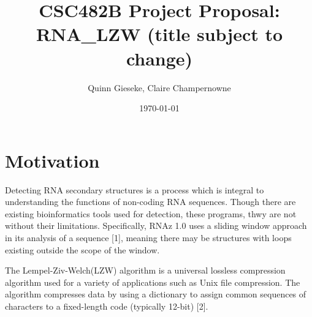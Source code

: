 \documentclass[letterpaper, 12pt]{artikel3}
\title{CSC482B Project Proposal: RNA\_LZW (title subject to change)}
\date{\today}
\author{Quinn Gieseke, Claire Champernowne}
\begin{document}
\maketitle










\section*{Motivation}
Detecting RNA secondary structures is a process which is integral to understanding the functions of non-coding RNA sequences. Though there are existing bioinformatics tools used for detection, these programs, thwy are not without their limitations.  Specifically,  RNAz 1.0 uses a sliding window approach in its analysis of a sequence [1], meaning there may be structures with loops existing outside the scope of the window. 

The Lempel-Ziv-Welch(LZW) algorithm is a universal lossless compression algorithm used for a variety of applications such as Unix file compression. The algorithm compresses data by using a dictionary to assign common sequences of characters to a fixed-length code (typically 12-bit) [2].
\end{document}
